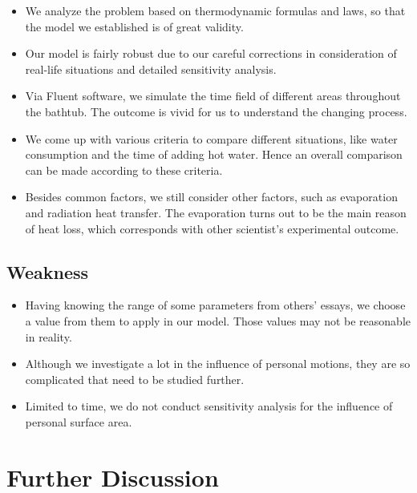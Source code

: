 \documentclass{mcmthesis}
\begin{document}
\begin{itemize}
\item We analyze the problem based on thermodynamic formulas and laws, so that 
the model we established is of great validity.

\item Our model is fairly robust due to our careful corrections in consideration 
of real-life situations and detailed sensitivity analysis.

\item Via Fluent software, we simulate the time field of different areas 
throughout the bathtub. The outcome is vivid for us to understand the changing 
process.

\item We come up with various criteria to compare different situations, like 
water consumption and the time of adding hot water. Hence an overall comparison 
can be made according to these criteria.

\item Besides common factors, we still consider other factors, such as evaporation 
and radiation heat transfer. The evaporation turns out to be the main reason of 
heat loss, which corresponds with other scientist’s experimental outcome.
\end{itemize}

\subsection{Weakness}

\begin{itemize}
\item Having knowing the range of some parameters from others’ essays, we choose 
a value from them to apply in our model. Those values may not be reasonable in 
reality.

\item Although we investigate a lot in the influence of personal motions, they 
are so complicated that need to be studied further.

\item Limited to time, we do not conduct sensitivity analysis for the influence 
of personal surface area.
\end{itemize}

\section{Further Discussion}
\end{document}

